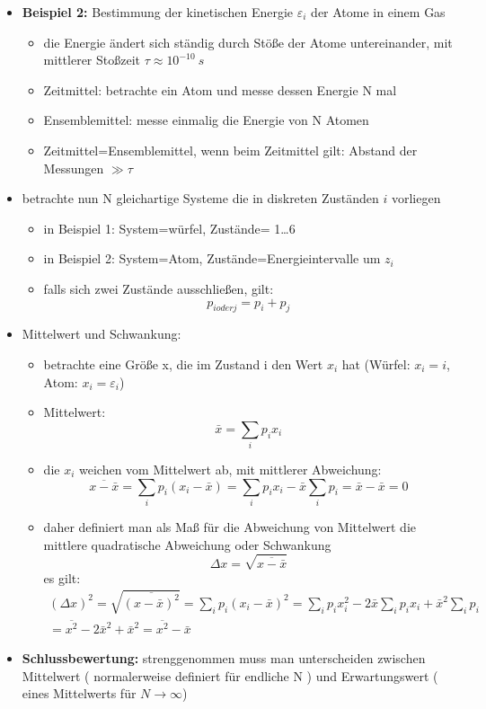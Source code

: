 \documentclass[ngerman]{scrartcl}
\begin{document}
\begin{itemize}
\begin{itemize}
			\end{itemize}
			\item \textbf{Beispiel 2:} Bestimmung der kinetischen Energie $\varepsilon_i$ der Atome in einem Gas\begin{itemize}
						\item die Energie ändert sich ständig durch Stöße der Atome untereinander, mit mittlerer Stoßzeit $\tau \approx 10^{-10}~s$
						\item Zeitmittel: betrachte ein Atom und messe dessen Energie N mal
						\item Ensemblemittel: messe einmalig die Energie von N Atomen
						\item Zeitmittel=Ensemblemittel, wenn beim Zeitmittel gilt: \newline Abstand der Messungen $\gg\tau$ 
			\end{itemize}
			\item betrachte nun N gleichartige Systeme die in diskreten Zuständen $i$ vorliegen\begin{itemize}
					\item in Beispiel 1: System=würfel, Zustände= 1\dots 6
					\item in Beispiel 2: System=Atom, Zustände=Energieintervalle um $z_i$
					\item falls sich zwei Zustände ausschließen, gilt: \[
					p_{i oder j}=p_i + p_j
					\]
			\end{itemize}
			\item Mittelwert und Schwankung:\begin{itemize}
					\item betrachte eine Größe x, die im Zustand i den Wert $x_i$ hat (Würfel: $x_i=i$, Atom: $x_i=\varepsilon_i$)
					\item Mittelwert: \[ \bar{x} = \sum_i p_i x_i\]
					\item die $x_i$ weichen vom Mittelwert ab, mit mittlerer Abweichung:
						\[ \overline{x - \bar{x}} = \sum_i p_i (x_i - \bar{x})= \sum_ip_ix_i - \bar{x}\sum_i p_i = \bar{x} - \bar{x} = 0 \]
					\item daher definiert man als Maß für die Abweichung von Mittelwert die mittlere quadratische Abweichung oder Schwankung \[ \Delta x = \sqrt{\overline{x - \bar{x}}}
\]					
							es gilt:
							\begin{gather}
								(\Delta x)^2=\sqrt{\overline{(x-\bar{x})^2}}=
								\sum_i p_i(x_i - \bar{x})^2 = 
								\sum_i p_i x_i^2 -2\bar{x}\sum_i p_i x_i + \bar{x}^2\sum_ip_i \\= \overline{x^2} - 2\bar{x}^2 +\bar{x}^2=\overline{x^2} - \bar{x}
							\end{gather}
			\end{itemize}
			
			\item \textbf{Schlussbewertung:} strenggenommen muss man unterscheiden zwischen Mittelwert ( normalerweise definiert für endliche N ) und Erwartungswert ( eines Mittelwerts für $N \rightarrow \infty$)
			
			
		\end{itemize}
		
\end{document}
